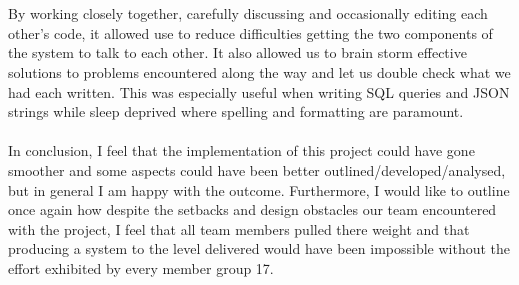\documentclass{project}
\begin{document}
\\\\
By working closely together, carefully discussing and occasionally editing each other's code, it allowed use to reduce difficulties getting the two components of the system to talk to each other. It also allowed us to brain storm effective solutions to problems encountered along the way and let us double check what we had each written. This was especially useful when writing SQL queries and JSON strings while sleep deprived where spelling and formatting are paramount.
\\\\
In conclusion, I feel that the implementation of this project could have gone smoother and some aspects could have been better outlined/developed/analysed, but in general I am happy with the outcome. Furthermore, I would like to outline once again how despite the setbacks and design obstacles our team encountered with the project, I feel that all team members pulled there weight and that producing a system to the level delivered would have been impossible without the effort exhibited by every member group 17.
\end{document}
